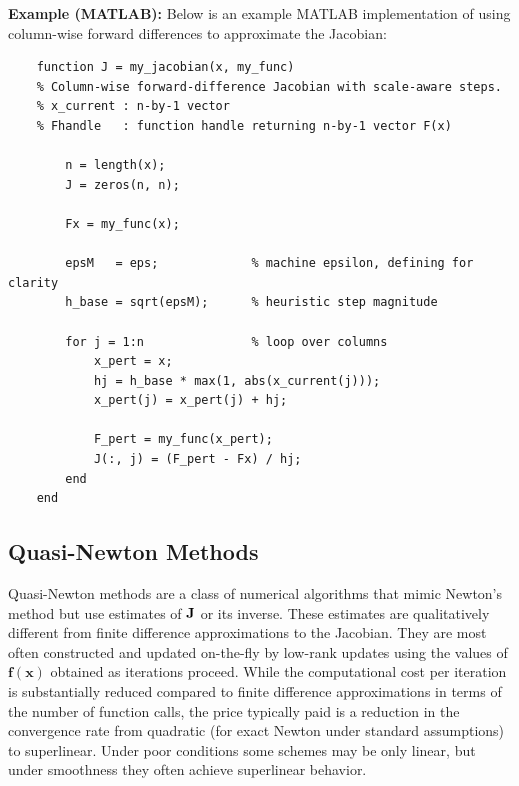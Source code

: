 \begin{exampleBox} %
    \textbf{Example (MATLAB):} Below is an example MATLAB implementation of using column-wise forward differences to approximate the Jacobian:
    \begin{verbatim}
    function J = my_jacobian(x, my_func)
    % Column-wise forward-difference Jacobian with scale-aware steps.
    % x_current : n-by-1 vector
    % Fhandle   : function handle returning n-by-1 vector F(x)

        n = length(x);
        J = zeros(n, n);

        Fx = my_func(x);

        epsM   = eps;             % machine epsilon, defining for clarity
        h_base = sqrt(epsM);      % heuristic step magnitude

        for j = 1:n               % loop over columns
            x_pert = x;
            hj = h_base * max(1, abs(x_current(j)));
            x_pert(j) = x_pert(j) + hj;

            F_pert = my_func(x_pert);
            J(:, j) = (F_pert - Fx) / hj;
        end
    end
    \end{verbatim}
\end{exampleBox}

\subsection{Quasi-Newton Methods} %
\label{sec:quasi-newton_methods}

Quasi-Newton methods are a class of numerical algorithms that mimic Newton's method but use estimates of \(\mathbf{J}\) or its inverse. These estimates are qualitatively different from finite difference approximations to the Jacobian. They are most often constructed and updated on-the-fly by low-rank updates using the values of $\mathbf f(\mathbf x)$ obtained as iterations proceed. While the computational cost per iteration is substantially reduced compared to finite difference approximations in terms of the number of function calls, the price typically paid is a reduction in the convergence rate from quadratic (for exact Newton under standard assumptions) to superlinear. Under poor conditions some schemes may be only linear, but under smoothness they often achieve superlinear behavior.


